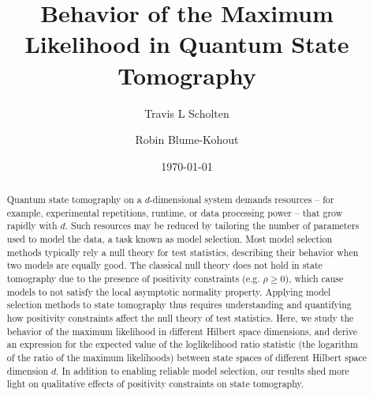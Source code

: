\documentclass[aps,pra, twocolumn]{revtex4-1}
\begin{document}
\author{Travis L Scholten}
\author{Robin Blume-Kohout}

\title{Behavior of the Maximum Likelihood in Quantum State Tomography}

\begin{abstract}
Quantum state tomography on a $d$-dimensional system demands resources -- for example, experimental repetitions, runtime, or data processing power -- that grow rapidly with $d$. Such resources may be reduced by tailoring the number of parameters used to model the data, a task known as model selection.  Most model selection methods typically rely a null theory for test statistics, describing their behavior when two models are equally good.  The classical null theory does not hold in state tomography due to the presence of positivity constraints (e.g. $\rho\geq0$), which cause models to not satisfy the local asymptotic normality property.  Applying model selection methods to state tomography thus requires understanding and quantifying how positivity constraints affect the null theory of test statistics.  Here, we study the behavior of the maximum likelihood in different Hilbert space dimensions, and derive an expression for the expected value of the loglikelihood ratio statistic (the logarithm of the ratio of the maximum likelihoods) between  state spaces of different Hilbert space dimension $d$.  In addition to enabling reliable model selection, our results shed more light on qualitative effects of positivity constraints on state tomography.
\end{abstract}
\date{\today}

\maketitle
\end{document}
